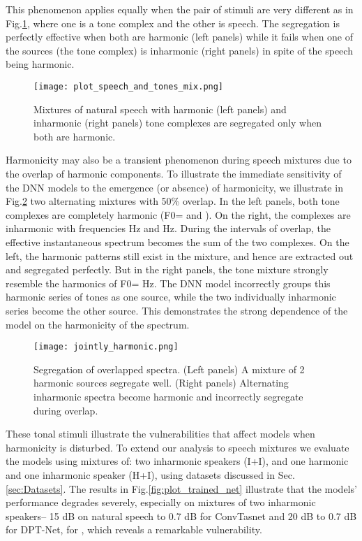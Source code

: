 \documentclass{article}
\begin{document}
This phenomenon applies equally when the pair of stimuli are very different as in Fig.\ref{fig:plot_speech_and_tones_mix}, where one is a tone complex and the other is speech. The segregation is perfectly effective when both are harmonic (left panels) while it fails when one of the sources (the tone complex) is inharmonic (right panels) in spite of the speech being harmonic.

\begin{figure}[!htbp]
  \centering
  \texttt{[image: plot\_speech\_and\_tones\_mix.png]}
  \caption{Mixtures of natural speech with harmonic (left panels) and inharmonic (right panels) tone complexes are segregated only when both are harmonic.}
  \label{fig:plot_speech_and_tones_mix}
\end{figure}
\vspace*{-2mm}
Harmonicity may also be a transient phenomenon during speech mixtures due to the overlap of harmonic components. To illustrate the immediate sensitivity of the DNN models to the emergence (or absence) of harmonicity, we illustrate in Fig.\ref{fig:overlap_harmonics} two alternating mixtures with  50\% overlap. In the left panels, both tone complexes are completely harmonic (F0= and ). On the right, the  complexes are inharmonic with frequencies   Hz and  Hz. During the intervals of overlap, the effective instantaneous spectrum becomes the sum of the two complexes. On the left, the harmonic patterns still exist in the mixture, and hence are extracted out and segregated perfectly. But in the right panels, the tone mixture strongly resemble the harmonics of F0= Hz. The DNN model incorrectly groups this harmonic series of tones as one source, while the two individually inharmonic series become the other source. This demonstrates the strong dependence of the model on the harmonicity of the spectrum.\\
\begin{figure}[htp]
  \centering
  \texttt{[image: jointly\_harmonic.png]}
  \caption{Segregation of overlapped spectra. (Left panels) A mixture of 2 harmonic sources segregate well. (Right panels) Alternating inharmonic spectra  become harmonic and incorrectly segregate during overlap.}
  \vspace*{-3mm}
  \label{fig:overlap_harmonics}
\end{figure}
These tonal stimuli illustrate the vulnerabilities that affect  models when harmonicity is disturbed. To extend our analysis to speech mixtures we evaluate the models using mixtures of: two inharmonic speakers (I+I), and one harmonic and one inharmonic speaker (H+I), using datasets discussed in Sec. \ref{sec:Datasets}. The results in Fig.\ref{fig:plot_trained_net} illustrate that the models' performance degrades severely, especially on mixtures of two inharmonic speakers-- 15 dB on natural speech to 0.7 dB for ConvTasnet and 20 dB to 0.7 dB for DPT-Net, for , which reveals a remarkable vulnerability.
\end{document}
